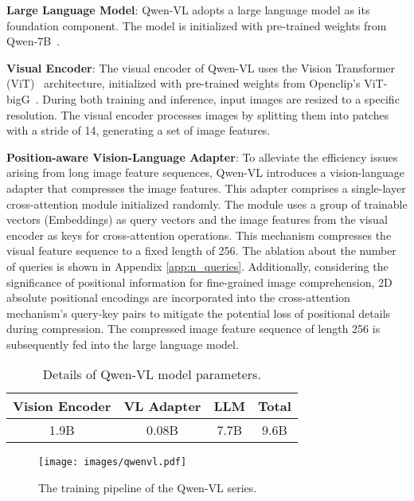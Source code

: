 \documentclass{article}
\begin{document}
\textbf{Large Language Model}: Qwen-VL adopts a large language model as its foundation component. The model is initialized with pre-trained weights from Qwen-7B~\citep{qwen7b}.

 
\textbf{Visual Encoder}: The visual encoder of Qwen-VL uses the Vision Transformer (ViT)~\citep{dosovitskiy2020vit} architecture, initialized with pre-trained weights from Openclip's ViT-bigG~\citep{openclip}. During both training and inference, input images are resized to a specific resolution. The visual encoder processes images by splitting them into patches with a stride of 14, generating a set of image features.

\textbf{Position-aware Vision-Language Adapter}: To alleviate the efficiency issues arising from long image feature sequences, Qwen-VL introduces a vision-language adapter that compresses the image features. This adapter comprises a single-layer cross-attention module initialized randomly. The module uses a group of trainable vectors (Embeddings) as query vectors and the image features from the visual encoder as keys for cross-attention operations. This mechanism compresses the visual feature sequence to a fixed length of 256. The ablation about the number of queries is shown in Appendix \ref{app:n_queries}. Additionally, considering the significance of positional information for fine-grained image comprehension, 2D absolute positional encodings are incorporated into the cross-attention mechanism's query-key pairs to mitigate the potential loss of positional details during compression. The compressed image feature sequence of length 256 is subsequently fed into the large language model.


\begin{table}[h]
    \centering
    \caption{Details of Qwen-VL model parameters.}
    \begin{tabular}{cccc}
         \toprule
         Vision Encoder & VL Adapter & LLM & Total  \\
         \midrule
         1.9B & 0.08B & 7.7B & 9.6B \\
         \bottomrule
    \end{tabular}
    \label{tab:model_parameter}
\end{table}



\begin{figure*}[ht]
\centering
\texttt{[image: images/qwenvl.pdf]}
    \caption{The training pipeline of the Qwen-VL series.}
\label{vl_train}
\end{figure*}
\end{document}
